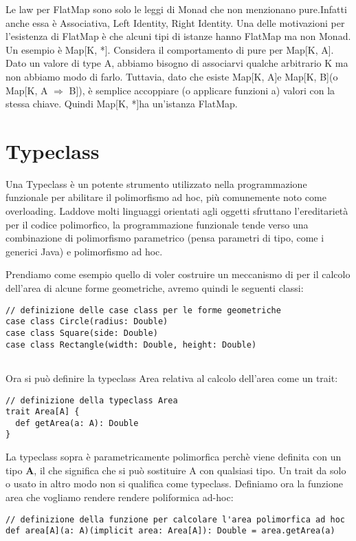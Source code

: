 \noindent Le law per FlatMap sono solo le leggi di Monad che non menzionano pure.Infatti anche essa è Associativa, Left Identity, Right Identity. Una delle motivazioni per l'esistenza di FlatMap è che alcuni tipi di istanze hanno FlatMap ma non Monad. Un esempio è Map[K, *]. Considera il comportamento di pure per Map[K, A]. Dato un valore di type A, abbiamo bisogno di associarvi qualche arbitrario K ma non abbiamo modo di farlo. Tuttavia, dato che esiste Map[K, A]e Map[K, B](o Map[K, A $\Rightarrow$ B]), è semplice accoppiare (o applicare funzioni a) valori con la stessa chiave. Quindi Map[K, *]ha un'istanza FlatMap.



\section{Typeclass}
Una Typeclass è un potente strumento utilizzato nella programmazione funzionale per abilitare il polimorfismo ad hoc, più comunemente noto come overloading. Laddove molti linguaggi orientati agli oggetti sfruttano l'ereditarietà per il codice polimorfico, la programmazione funzionale tende verso una combinazione di polimorfismo parametrico (pensa parametri di tipo, come i generici Java) e polimorfismo ad hoc.

\noindent Prendiamo come esempio quello di voler costruire un meccanismo di per il calcolo dell'area di alcune forme geometriche, avremo quindi le seguenti classi:
\begin{verbatim}
// definizione delle case class per le forme geometriche
case class Circle(radius: Double)
case class Square(side: Double)
case class Rectangle(width: Double, height: Double)
    
\end{verbatim}

\noindent Ora si può definire la typeclass Area relativa al calcolo dell'area come un trait:

\begin{verbatim}
// definizione della typeclass Area
trait Area[A] {
  def getArea(a: A): Double
}
\end{verbatim}

\noindent La typeclass sopra è parametricamente polimorfica perchè viene definita con un tipo \textbf{A}, il che significa che si può sostituire A con qualsiasi tipo. Un trait da solo o usato in altro modo non si qualifica come typeclass. Definiamo ora la funzione area che vogliamo rendere rendere poliformica ad-hoc:
\begin{verbatim}
// definizione della funzione per calcolare l'area polimorfica ad hoc
def area[A](a: A)(implicit area: Area[A]): Double = area.getArea(a)
\end{verbatim}

